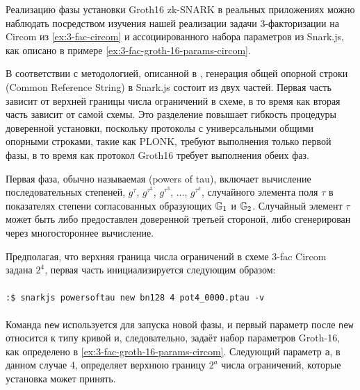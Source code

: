 \begin{example}
\label{ex:3-fac-groth-16-setup-circom} Реализацию фазы установки Groth16 zk-SNARK в реальных приложениях можно наблюдать посредством изучения нашей реализации задачи 3-факторизации на Circom из \ref{ex:3-fac-circom} и ассоциированного набора параметров из Snark.js, как описано в примере \ref{ex:3-fac-groth-16-params-circom}.

В соответствии с методологией, описанной в \cite{bowe-17}, генерация общей опорной строки (Common Reference String) в Snark.js состоит из двух частей. Первая часть зависит от верхней границы числа ограничений в схеме, в то время как вторая часть зависит от самой схемы. Это разделение повышает гибкость процедуры доверенной установки, поскольку протоколы с универсальными общими опорными строками, такие как PLONK, требуют выполнения только первой фазы, в то время как протокол Groth16 требует выполнения обеих фаз.

Первая фаза, обычно называемая  (powers of tau), включает вычисление последовательных степеней, $g^\tau$, $g^{\tau^2}$, $g^{\tau^3}$, $\ldots$, $g^{\tau^k}$, случайного элемента поля $\tau$ в показателях степени согласованных образующих $\mathbb{G}_1$ и $\mathbb{G}_2$. Случайный элемент $\tau$ может быть либо предоставлен доверенной третьей стороной, либо сгенерирован через многостороннее вычисление.

Предполагая, что верхняя граница числа ограничений в схеме 3-fac Circom задана $2^4$, первая часть инициализируется следующим образом:
\\
\\
\texttt{:\$ snarkjs powersoftau new bn128 4 pot4\_0000.ptau -v}
\\
\\
Команда \texttt{new} используется для запуска новой фазы, и первый параметр после \texttt{new} относится к типу кривой и, следовательно, задаёт набор параметров Groth-16, как определено в \ref{ex:3-fac-groth-16-params-circom}. Следующий параметр \texttt{a}, в данном случае 4, определяет верхнюю границу $2^a$ числа ограничений, которые установка может принять.


\end{example}
